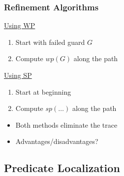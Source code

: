 
\begin{frame}
\frametitle{Refinement Algorithms}

\underline{Using WP}

\begin{enumerate}
\item Start with failed guard $G$
\item Compute $wp(G)$ along the path
\end{enumerate}
\vfill

\underline{Using SP}

\begin{enumerate}
\item Start at beginning
\item Compute $sp(\ldots)$ along the path
\end{enumerate}
\vfill

\begin{itemize}
\item Both methods eliminate the trace
\item Advantages/disadvantages?
\end{itemize}

\end{frame}


\subsection{Predicate Localization}

\lstset{language=C}

